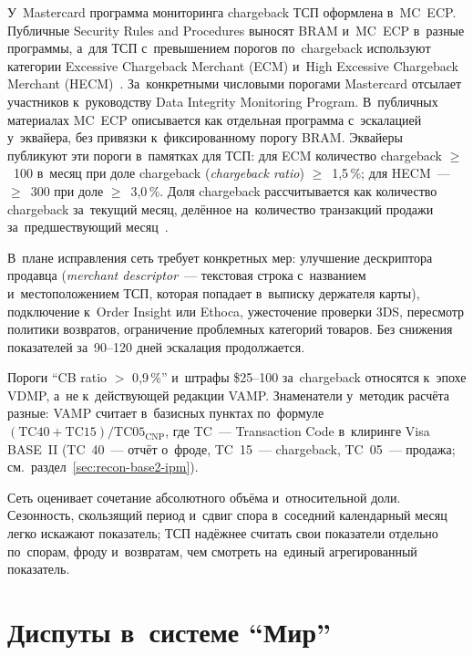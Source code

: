 У~Mastercard программа мониторинга chargeback ТСП оформлена в~MC~ECP.
Публичные Security Rules and Procedures выносят BRAM и~MC~ECP в~разные
программы, а~для ТСП с~превышением порогов по~chargeback используют
категории Excessive Chargeback Merchant (ECM) и~High Excessive Chargeback
Merchant (HECM)~\cite{mc-compliance-programs,mc-spme-2025}. За~конкретными
числовыми порогами Mastercard отсылает участников к~руководству Data Integrity
Monitoring Program. В~публичных материалах MC~ECP описывается как отдельная
программа с~эскалацией у~эквайера, без привязки к~фиксированному
порогу BRAM.
Эквайеры публикуют эти пороги в~памятках для ТСП: для ECM количество chargeback $\geq$~100
в~месяц при доле chargeback (\textit{chargeback ratio})
$\geq$~1,5\,\%; для HECM~--- $\geq$~300 при доле $\geq$~3,0\,\%. Доля
chargeback рассчитывается как количество chargeback
за~текущий месяц, делённое на~количество транзакций продажи
за~предшествующий месяц~\cite{jpm-mc-ecp-guide}.

В~плане исправления сеть требует конкретных мер: улучшение дескриптора
продавца (\textit{merchant descriptor}~--- текстовая строка с~названием
и~местоположением ТСП, которая попадает в~выписку держателя карты), подключение
к~Order Insight или Ethoca, ужесточение проверки 3DS, пересмотр политики
возвратов, ограничение проблемных категорий товаров. Без снижения показателей
за~90--120 дней эскалация продолжается.

Пороги \enquote{CB ratio $>$ 0{,}9\,\%} и~штрафы \$25--100 за~chargeback относятся к~эпохе VDMP, а~не к~действующей редакции VAMP.
Знаменатели у~методик расчёта разные: VAMP считает в~базисных пунктах по~формуле
$(\text{TC}40+\text{TC}15)/\text{TC}05_{\text{CNP}}$, где TC~--- Transaction
Code в~клиринге Visa BASE~II (TC~40~--- отчёт о~фроде, TC~15~--- chargeback, TC~05~--- продажа; см.~раздел~\ref{sec:recon-base2-ipm}).

Сеть оценивает сочетание абсолютного объёма и~относительной доли. Сезонность,
скользящий период и~сдвиг спора в~соседний календарный месяц легко искажают
показатель; ТСП надёжнее считать свои показатели отдельно по~спорам, фроду
и~возвратам, чем смотреть на~единый агрегированный показатель.

\section{Диспуты в~системе \enquote{Мир}}\label{sec:disputes-mir}

